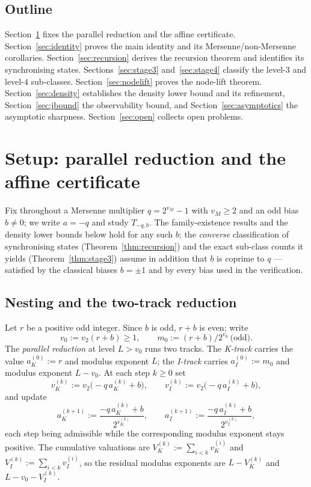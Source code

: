 \documentclass[11pt,reqno]{amsart}
\theoremstyle{plain}
\theoremstyle{definition}
\theoremstyle{remark}
\newcommand{\Tnegq}{T_{-q,b}}
\newcommand{\Vk}{V_{K}}
\newcommand{\Vi}{V_{I}}
\newcommand{\vk}{v_{K}}
\newcommand{\vi}{v_{I}}
\newcommand{\aK}{a_{K}}
\newcommand{\aI}{a_{I}}
\newcommand{\vtwo}{v_{2}}
\newcommand{\vM}{v_{M}}
\begin{document}
\subsection{Outline}

Section~\ref{sec:setup} fixes the parallel reduction and the affine
certificate. Section~\ref{sec:identity} proves the main identity and its
Mersenne/non-Mersenne corollaries. Section~\ref{sec:recursion} derives the
recursion theorem and identifies its synchronising states.
Sections~\ref{sec:stage3} and~\ref{sec:stage4} classify the level-$3$ and
level-$4$ sub-classes. Section~\ref{sec:nodelift} proves the node-lift
theorem. Section~\ref{sec:density} establishes the density lower bound and
its refinement, Section~\ref{sec:jbound} the observability bound, and
Section~\ref{sec:asymptotics} the asymptotic sharpness.
Section~\ref{sec:open} collects open problems.

\section{Setup: parallel reduction and the affine certificate}\label{sec:setup}

Fix throughout a Mersenne multiplier $q = 2^{\vM} - 1$ with $\vM \ge 2$ and an
odd bias $b \ne 0$; we write $a = -q$ and study $\Tnegq$. The
family-existence results and the density lower bounds below hold for any such
$b$; the \emph{converse} classification of synchronising states
(Theorem~\ref{thm:recursion}) and the exact sub-class counts it yields
(Theorem~\ref{thm:stage3}) assume in addition that $b$ is coprime to $q$ ---
satisfied by the classical biases $b = \pm 1$ and by every bias used in the
verification.

\subsection{Nesting and the two-track reduction}

Let $r$ be a positive odd integer. Since $b$ is odd, $r + b$ is even; write
\[
v_0 := \vtwo(r + b) \ge 1, \qquad m_0 := (r + b)/2^{v_0} \ \text{(odd)}.
\]
The \emph{parallel reduction} at level $L > v_0$ runs two tracks. The
\emph{K-track} carries the value $\aK^{(0)} := r$ and modulus exponent $L$;
the \emph{I-track} carries $\aI^{(0)} := m_0$ and modulus exponent
$L - v_0$. At each step $k \ge 0$ set
\[
\vk^{(k)} := \vtwo\!\big(-q\,\aK^{(k)} + b\big), \qquad
\vi^{(k)} := \vtwo\!\big(-q\,\aI^{(k)} + b\big),
\]
and update
\[
\aK^{(k+1)} := \frac{-q\,\aK^{(k)} + b}{2^{\vk^{(k)}}}, \qquad
\aI^{(k+1)} := \frac{-q\,\aI^{(k)} + b}{2^{\vi^{(k)}}},
\]
each step being admissible while the corresponding modulus exponent stays
positive. The cumulative valuations are
$\Vk^{(k)} := \sum_{i < k} \vk^{(i)}$ and
$\Vi^{(k)} := \sum_{i < k} \vi^{(i)}$, so the residual modulus exponents are
$L - \Vk^{(k)}$ and $L - v_0 - \Vi^{(k)}$.
\end{document}
